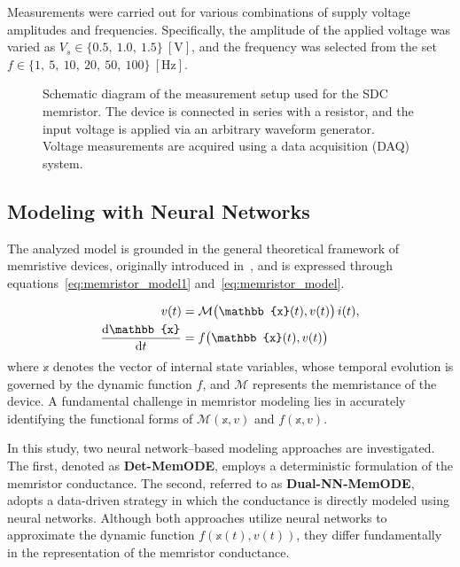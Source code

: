 \documentclass[11pt, oneside]{article}
\newcommand{\der}{{\rm d}}
\newcommand{\M}{\mathcal{M}}
\newcommand{\ua}{v}
\newcommand{\ia}{i}
\begin{document}
Measurements were carried out for various combinations of supply voltage amplitudes and frequencies. Specifically, the amplitude of the applied voltage was varied as \(V_s \in \{0.5,\ 1.0,\ 1.5\}~\mathrm{[V]}\), and the frequency was selected from the set \(f \in \{1,\ 5,\ 10,\ 20,\ 50,\ 100\}~\mathrm{[Hz]}\).


\begin{figure}[H]
    \centering
    \resizebox{0.5\linewidth}{!}{%
        }
    \vspace{-0.5in}
    \caption{Schematic diagram of the measurement setup used for the SDC memristor. The device is connected in series with a resistor, and the input voltage is applied via an arbitrary waveform generator. Voltage measurements are acquired using a data acquisition (DAQ) system.}
    \label{fig:memristor_setup}
\end{figure}

\subsection{Modeling with Neural Networks}
The analyzed model is grounded in the general theoretical framework of memristive devices, originally introduced in~\cite{Chua1976}, and is expressed through equations~\eqref{eq:memristor_model1} and~\eqref{eq:memristor_model}.


\newcommand{\xvec}{\mathbb{x}}
\begin{align}
    \label{eq:memristor_model1}
    \ua(t)                    & = \M \big(\xvec(t),\ua(t)\big) \, \ia(t), \\
    \label{eq:memristor_model}
    \frac{\der \xvec}{\der t} & = f\big(\xvec(t),\ua(t)\big)
\end{align}
where \(\xvec\) denotes the vector of internal state variables, whose temporal evolution is governed by the dynamic function \(f\), and \(\M\) represents the memristance of the device. A fundamental challenge in memristor modeling lies in accurately identifying the functional forms of \(\M(\xvec,\ua)\) and \(f(\xvec,\ua)\).

In this study, two neural network–based modeling approaches are investigated. The first, denoted as \textbf{Det-MemODE}, employs a deterministic formulation of the memristor conductance. The second, referred to as \textbf{Dual-NN-MemODE}, adopts a data-driven strategy in which the conductance is directly modeled using neural networks. Although both approaches utilize neural networks to approximate the dynamic function \(f(\xvec(t), \ua(t))\), they differ fundamentally in the representation of the memristor conductance.
\end{document}
